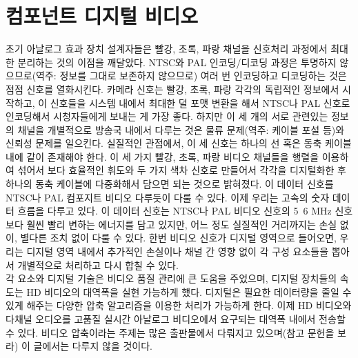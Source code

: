 \section{컴포넌트 디지털 비디오}
초기 아날로그 효과 장치 설계자들은 빨강, 초록, 파랑 채널을 신호처리 과정에서 최대한 분리하는 것의 이점을 깨달았다.
NTSC와 PAL 인코딩/디코딩 과정은 투명하지 않으므로(역주: 정보를 그대로 보존하지 않으므로) 여러 번 인코딩하고 디코딩하는 것은 점점 신호를 열화시킨다.
카메라 신호는 빨강, 초록, 파랑 각각의 독립적인 정보에서 시작하고, 이 신호들을 시스템 내에서 최대한 덜 포맷 변환을 해서 NTSC나 PAL 신호로 인코딩해서 시청자들에게 보내는 게 가장 좋다.
하지만 이 세 개의 서로 관련있는 정보의 채널을 개별적으로 방송국 내에서 다루는 것은 물류 문제(역주: 케이블 포설 등)와 신뢰성 문제를 일으킨다.
실질적인 관점에서, 이 세 신호는 하나의 선 혹은 동축 케이블 내에 같이 존재해야 한다.
이 세 가지 빨강, 초록, 파랑 비디오 채널들을 행렬을 이용하여 섞어서 보다 효율적인 휘도와 두 가지 색차 신호로 만들어서 각각을 디지털화한 후 하나의 동축 케이블에 다중화해서 담으면 되는 것으로 밝혀졌다.
이 데이터 신호를 NTSC나 PAL 컴포지트 비디오 다루듯이 다룰 수 있다. 이제 우리는 고속의 숫자 데이터 흐름을 다루고 있다.
이 데이터 신호는 NTSC나 PAL 비디오 신호의 5~6 MHz 신호보다 훨씬 빨리 변하는 에너지를 담고 있지만, 어느 정도 실질적인 거리까지는 손실 없이, 별다른 조치 없이 다룰 수 있다.
한번 비디오 신호가 디지털 영역으로 들어오면, 우리는 디지털 영역 내에서 추가적인 손실이나 채널 간 영향 없이 각 구성 요소들을 뽑아서 개별적으로 처리하고 다시 합칠 수 있다.
\\
각 요소와 디지털 기술은 비디오 품질 관리에 큰 도움을 주었으며, 디지털 장치들의 속도는 HD 비디오의 대역폭을 실현 가능하게 했다.
디지털은 필요한 데이터량을 줄일 수 있게 해주는 다양한 압축 알고리즘을 이용한 처리가 가능하게 한다.
이제 HD 비디오와 다채널 오디오를 고품질 실시간 아날로그 비디오에서 요구되는 대역폭 내에서 전송할 수 있다.
비디오 압축이라는 주제는 많은 출판물에서 다뤄지고 있으며(참고 문헌을 보라) 이 글에서는 다루지 않을 것이다.